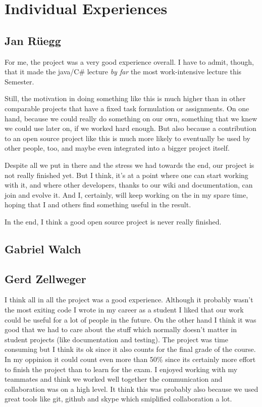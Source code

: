 \section{Individual Experiences}
\label{individual}

\subsection{Jan Rüegg}
\label{individual:jan}
For me, the project was a very good experience overall. I have to admit, though, that it made the java/C\# lecture \textit{by far} the most work-intensive lecture this Semester.

Still, the motivation in doing something like this is much higher than in other comparable projects that have a fixed task formulation or assignments. On one hand, because we could really do something on our own, something that we knew we could use later on, if we worked hard enough. But also because a contribution to an open source project like this is much more likely to eventually be used by other people, too, and maybe even integrated into a bigger project itself.

Despite all we put in there and the stress we had towards the end, our project is not really finished yet. But I think, it's at a point where one can start working with it, and where other developers, thanks to our wiki and documentation, can join and evolve it. And I, certainly, will keep working on the in my spare time, hoping that I and others find something useful in the result.

In the end, I think a good open source project is never really finished.

\subsection{Gabriel Walch}
\label{individual:gabriel}

\subsection{Gerd Zellweger}
\label{individual:gerd}
I think all in all the project was a good experience. Although it probably wasn't the most exiting code I wrote in my career as a student I liked that our work could be useful for a lot of people in the future. On the other hand I think it was good that we had to care about the stuff which normally doesn't matter in student projects (like documentation and testing). The project was time consuming but I think its ok since it also counts for the final grade of the course. In my oppinion it could count even more than 50\% since its certainly more effort to finish the project than to learn for the exam.
I enjoyed working with my teammates and think we worked well together the communication and collaboration was on a high level. It think this was probably also because we used great tools like git, github and skype which smiplified collaboration a lot.